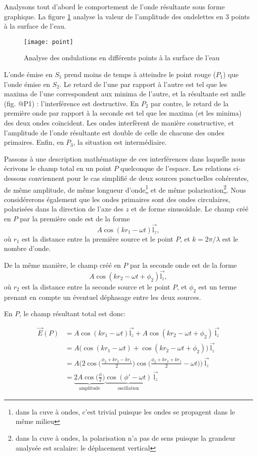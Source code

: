Analysons tout d'abord le comportement de l'onde résultante sous forme graphique. La figure \ref{point} analyse la valeur de l'amplitude des ondelettes en 3 points à la surface de l'eau.

\begin{figure}[htb]
\centering
\texttt{[image: point]}
\caption{Analyse des ondulations en différents points à la surface de l'eau}
\label{point}
\end{figure}

L'onde émise en $S_1$ prend moins de temps à atteindre le point rouge ($P_1$) que l'onde émise en $S_2$. Le retard de l'une par rapport à l'autre est tel que les maxima de l'une correspondent aux minima de l'autre, et la résultante est nulle (fig. @P1) : l'interférence est destructive. En $P_2$ par contre, le retard de la première onde par rapport à la seconde est tel que les maxima (et les minima) des deux ondes coïncident. Les ondes interfèrent de manière constructive, et l'amplitude de l'onde résultante est double de celle de chacune des ondes primaires. Enfin, en $P_3$, la situation est intermédiaire.

Passons à une description mathématique de ces interférences dans laquelle nous écrivons le champ total en un point $P$ quelconque de l'espace. Les relations ci-dessous conviennent pour le cas simplifié de deux sources ponctuelles cohérentes, de même amplitude, de même longueur d'onde\footnote{dans la cuve à ondes, c'est trivial puisque les ondes se propagent dans le même milieu} et de même polarisation\footnote{dans la cuve à ondes, la polarisation n'a pas de sens puisque la grandeur analysée est scalaire: le déplacement vertical}. Nous considérerons également que les ondes primaires sont des ondes circulaires, polarisées dans la direction de l'axe des $z$ et de forme sinusoïdale.
Le champ créé en $P$ par la première onde est de la forme 
$$A \cos (kr_1-\omega t)\overset\rightarrow{\mbox{l}_z},$$
où $r_1$ est la distance entre la première source et le point $P$, et $k=2\pi/\lambda$ est le nombre d'onde. 

De la même manière, le champ créé en $P$ par la seconde onde est de la forme 
$$A \cos (kr_2-\omega t +\phi_2)\overset\rightarrow{\mbox{l}_z},$$
où $r_2$ est la distance entre la seconde source et le point $P$, et $\phi_2$ est un terme prenant en compte un éventuel déphasage entre les deux sources. 

En $P$, le champ résultant total est donc:

\begin{align*}
\overset\rightarrow{E}(P)&=A \cos (kr_1-\omega t)\overset\rightarrow{\mbox{l}_z} + A \cos (kr_2-\omega t +\phi_2)\:\overset\rightarrow{\mbox{l}_z} \\&
=A \bigg(\cos (kr_1-\omega t)+ \cos (kr_2-\omega t +\phi_2)\bigg)\:\overset\rightarrow{\mbox{l}_z}\\&
=A \bigg(2\cos \Big(\frac{\phi_2 +kr_2-kr_1}{2}\Big)\cos \Big(\frac{\phi_2 +kr_2+kr_1}{2}-\omega t\Big)\bigg)\:\overset\rightarrow{\mbox{l}_z}\\&
=\underbrace{2A\cos \Big(\frac{\phi}{2}\Big)}_\textrm{amplitude}\underbrace{\cos (\phi'-\omega t)}_\textrm{oscillation}\:\overset\rightarrow{\mbox{l}_z}
\end{align*}

